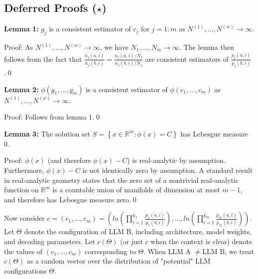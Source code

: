 \documentclass{article}
\begin{document}
\subsection{Deferred Proofs ($\star$)}



\textbf{Lemma 1:} $\displaystyle g_{j}$ is a consistent estimator of $\displaystyle c_{j}$ for $\displaystyle j=1:m$ as $\displaystyle N^{\left( 1\right)} ,...,N^{\left( w\right)}\rightarrow \infty $.



Proof: As $\displaystyle N^{\left( 1\right)} ,...,N^{\left( w\right)}\rightarrow \infty $, we have $\displaystyle N_{1} ,...,N_{m}\rightarrow \infty $. The lemma then follows from the fact that $\displaystyle \frac{n_{j}\left( a,i\right)}{n_{j}\left( b,i\right)} =\frac{n_{j}\left( a,i\right) /N_{j}}{n_{j}\left( b,i\right) /N_{j}}$ are consistent estimators of $\displaystyle \frac{p_{j}\left( a,i\right)}{p_{j}\left( b,i\right)}$.\qed 



\textbf{Lemma 2:} $\displaystyle \phi \left( g_{1} ,...,g_{m}\right)$ is a consistent estimator of $\displaystyle \phi \left( c_{1} ,...,c_{m}\right)$ as $\displaystyle N^{\left( 1\right)} ,...,N^{\left( w\right)}\rightarrow \infty $.

Proof: Follows from lemma 1.\qed 



\textbf{Lemma 3:} The solution set $\displaystyle S=\left\{x\in \mathbb{R}^{m} :\phi \left( x\right) =C\right\}$ has Lebesgue measure 0.

Proof: $\displaystyle \phi \left( x\right)$ (and therefore $\displaystyle \phi \left( x\right) -C$) is real-analytic by assumption. Furthermore, $\displaystyle \phi \left( x\right) -C$ is not identically zero by assumption. A standard result in real-analytic geometry states that the zero set of a nontrivial real-analytic function on $\displaystyle \mathbb{R}^{m}$ is a countable union of manifolds of dimension at most $\displaystyle m-1$, and therefore has Lebesgue measure zero.\qed 



Now consider $\displaystyle c=\left( c_{1} ,...,c_{m}\right) =\left( ln\left(\prod _{i=1}^{k_{1}}\frac{p_{1}\left( a,i\right)}{p_{1}\left( b,i\right)}\right) ,...,ln\left(\prod _{i=1}^{k_{m}}\frac{p_{m}\left( a,i\right)}{p_{m}\left( b,i\right)}\right)\right)$. Let $\displaystyle \Theta $ denote the configuration of LLM B, including architecture, model weights, and decoding parameters. Let $\displaystyle c\left( \Theta \right)$ (or just $\displaystyle c$ when the context is clear) denote the values of $\displaystyle \left( c_{1} ,...,c_{m}\right)$ corresponding to $\displaystyle \Theta $. When LLM A $\displaystyle \neq $LLM B, we treat $\displaystyle c\left( \Theta \right)$ as a random vector over the distribution of "potential" LLM configurations $\displaystyle \Theta $.
\end{document}
